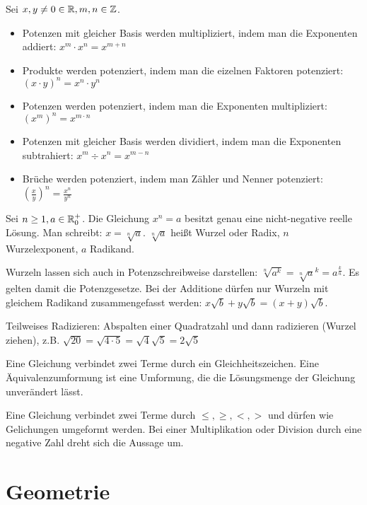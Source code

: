 \begin{satz}
	Sei $x,y \neq 0 \in \mathbb{R}, m,n \in \mathbb{Z}$.
	\begin{itemize}[noitemsep]
		\item Potenzen mit gleicher Basis werden multipliziert, indem man die Exponenten addiert: $x^m \cdot x^n = x^{m + n}$
		\item  Produkte werden potenziert, indem man die eizelnen Faktoren potenziert: $(x \cdot y)^n = x^n \cdot y^n$
		\item  Potenzen werden potenziert, indem man die Exponenten multipliziert: $(x^m)^n = x^{m \cdot n}$
		\item Potenzen mit gleicher Basis werden dividiert, indem man die Exponenten subtrahiert: $x^m \div x^n = x^{m - n}$
		\item  Brüche werden potenziert, indem man Zähler und Nenner potenziert: $(\frac{x}{y})^n = \frac{x^n}{y^n}$
	\end{itemize} 
\end{satz}

\begin{definition}[Wurzel]
	Sei $n \geq 1, a \in \mathbb{R}^+_0$. Die Gleichung $x^n = a$ besitzt genau eine nicht-negative reelle Lösung. Man schreibt: $x = \sqrt[n]{a}$. $\sqrt[n]{a}$ heißt Wurzel oder Radix, $n$ Wurzelexponent, $a$ Radikand.	
	
	Wurzeln lassen sich auch in Potenzschreibweise darstellen: $\sqrt[n]{a^k} = \sqrt[n]{a}^k = a^{\frac{k}{n}}$. Es gelten damit die Potenzgesetze. 
	Bei der Additione dürfen nur Wurzeln mit gleichem Radikand zusammengefasst werden: $x\sqrt{b} + y\sqrt{b} = (x+y)\sqrt{b}$.
	
	Teilweises Radizieren: Abspalten einer Quadratzahl und dann radizieren (Wurzel ziehen), z.B. $\sqrt{20} = \sqrt{4 \cdot 5} = \sqrt{4}\sqrt{5}= 2 \sqrt{5}$
\end{definition}

\begin{definition}[Gleichung]
	Eine Gleichung verbindet zwei Terme durch ein Gleichheitszeichen. Eine Äquivalenzumformung ist eine Umformung, die die Lösungsmenge der Gleichung unverändert lässt.
\end{definition}

\begin{definition}[Ungleichung]
		Eine Gleichung verbindet zwei Terme durch $\leq, \geq, <, >$ und dürfen wie Gelichungen umgeformt werden. Bei einer Multiplikation oder Division durch eine negative Zahl dreht sich die Aussage um.
\end{definition}

\pagebreak
\section{Geometrie}